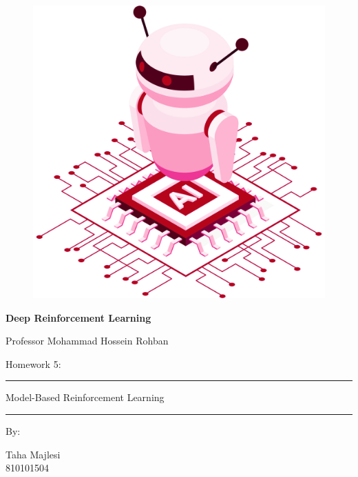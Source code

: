 \documentclass[12pt]{article}
\numberwithin{equation}{section}
\numberwithin{figure}{section}
\numberwithin{table}{section}
\numberwithin{algorithm}{section}
\begin{document}
\thispagestyle{plain}

\begin{center}

\vspace*{-1.5cm}
\begin{figure}[!h]
    \centering
    \includegraphics[width=0.7\linewidth]{figs/cover-std.png}
\end{figure}

{

{\color{DarkBlue} {\fontsize{30}{50} \textbf{
Deep Reinforcement Learning
}}}

{\color{DarkBlue} {\Large
Professor Mohammad Hossein Rohban
}}
}


\vspace{20pt}

{


{\color{RedOrange}
{\Large
Homework 5:
}\\
}
{\color{BrickRed}
\rule{12cm}{0.5pt}

{\Huge
Model-Based Reinforcement Learning
}
\rule{12cm}{0.5pt}
}

\vspace{10pt}

{\color{RoyalPurple} { \small By:} } \\
\vspace{10pt}

{\color{Blue} { \LARGE Taha Majlesi } } \\
\vspace{5pt}
{\color{RoyalBlue} { \Large 810101504 } }


}
\end{center}
\end{document}
